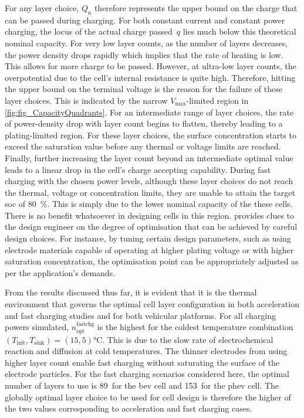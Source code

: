 For any layer  choice, $Q_\text{n}$ therefore represents the upper  bound on the
charge  that can  be  passed  during charging.  For  both  constant current  and
constant power  charging, the locus  of the  actual charge passed~$q$  lies much
below  this theoretical  nominal capacity.  For very  low layer  counts, as  the
number of layers  decreases, the power density drops rapidly  which implies that
the rate of heating  is low. This allows for more charge  to be passed. However,
at  ultra-low  layer  counts,  the  overpotential due  to  the  cell's  internal
resistance is  quite high. Therefore,  hitting the  upper bound on  the terminal
voltage is the reason for the failure  of these layer choices. This is indicated
by the narrow $V_\text{max}$-limited region in \cref{fig:fig_CapacityQuadrants}.
For an intermediate range of layer  choices, the rate of power-density drop with
layer count begins to flatten, thereby  leading to a plating-limited region. For
these layer choices,  the surface concentration starts to  exceed the saturation
value  before  any thermal  or  voltage  limits  are reached.  Finally,  further
increasing  the layer  count beyond  an intermediate  optimal value  leads to  a
linear drop in the cell's charge accepting capability. During fast charging with
the chosen power levels, although these  layer choices do not reach the thermal,
voltage or concentration limits, they are  unable to attain the target \gls{soc}
of \SI{80}{\percent}.  This is simply due  to the lower nominal  capacity of the
these cells. There  is no benefit whatsoever in designing  cells in this region.
 provides  clues to  the design engineer  on the
degree  of optimisation  that can  be achieved  by careful  design choices.  For
instance, by tuning certain design parameters, such as using electrode materials
capable  of  operating at  higher  plating  voltage  or with  higher  saturation
concentration, the optimisation  point can be appropriately adjusted  as per the
application's demands.


From  the results  discussed thus  far, it  is evident  that it  is the  thermal
environment  that  governs   the  optimal  cell  layer   configuration  in  both
acceleration and fast charging studies and for both vehicular platforms. For all
charging powers simulated, $n^\text{fastchg}_\text{opt}$  is the highest for the
coldest temperature  combination \mbox{$(T_\text{init},T_\text{sink}) =  (15, 5)
\si{\degreeCelsius}$}. This is due to  the slow rate of electrochemical reaction
and diffusion  at cold  temperatures. The thinner  electrodes from  using higher
layer count enable fast charging without saturating the surface of the electrode
particles. For the  fast charging scenarios considered here,  the optimal number
of layers to use  is 89~for the \gls{bev} cell and  153~for the \gls{phev} cell.
The globally optimal  layer choice to be  used for cell design  is therefore the
higher of the two values corresponding  to acceleration and fast charging cases.

